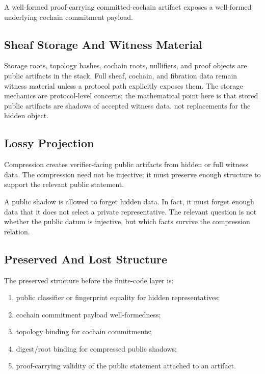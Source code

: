 \begin{proposition}\label{prop:proof-carrying-artifact-exposes-payload}
  A well-formed proof-carrying committed-cochain artifact exposes a well-formed
  underlying cochain commitment payload.
\end{proposition}

\subsection{Sheaf Storage And Witness Material}

Storage roots, topology hashes, cochain roots, nullifiers, and proof objects are
public artifacts in the stack. Full sheaf, cochain, and fibration data remain
witness material unless a protocol path explicitly exposes them. The storage
mechanics are protocol-level concerns; the mathematical point here is that
stored public artifacts are shadows of accepted witness data, not replacements
for the hidden object.

\subsection{Lossy Projection}

Compression creates verifier-facing public artifacts from hidden or full
witness data. The compression need not be injective; it must preserve enough
structure to support the relevant public statement.

A public shadow is allowed to forget hidden data. In fact, it must forget
enough data that it does not select a private representative. The relevant
question is not whether the public datum is injective, but which facts survive
the compression relation.

\subsection{Preserved And Lost Structure}

The preserved structure before the finite-code layer is:
\begin{enumerate}[label=(\roman*)]
  \item public classifier or fingerprint equality for hidden representatives;
  \item cochain commitment payload well-formedness;
  \item topology binding for cochain commitments;
  \item digest/root binding for compressed public shadows;
  \item proof-carrying validity of the public statement attached to an artifact.
\end{enumerate}

